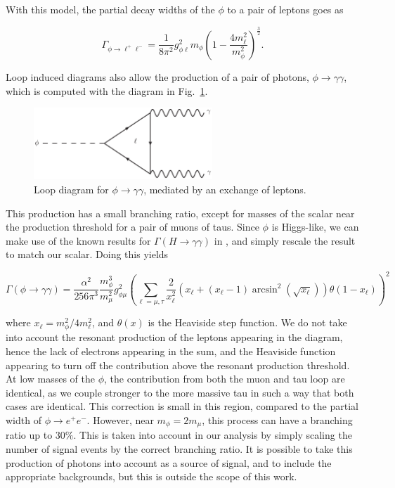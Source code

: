 With this model, the partial decay widths of the $\phi$ to a pair of leptons goes as

\begin{equation}
    \Gamma_{\phi \rightarrow \ell^+ \ell^-} = \frac{1}{8\pi^2} g_{\phi\ell}^2 m_\phi \left(1-\frac{4m_\ell^2}{m_\phi^2}\right)^{\frac{3}{2}}\textrm{.}
\end{equation}

Loop induced diagrams also allow the production of a pair of photons, $\phi \rightarrow \gamma \gamma$, which is computed with the diagram in Fig.~\ref{fig:phi_gammagamma_loop}.

\begin{figure}[h]
    \centering
    \includegraphics[width = 0.6\textwidth]{Figures/feynman_diagrams/phi_gammagamma}
    \caption{Loop diagram for $\phi \rightarrow \gamma \gamma$, mediated by an exchange of leptons.}
    \label{fig:phi_gammagamma_loop}
\end{figure}

\noindent This production has a small branching ratio, except for masses of the scalar near the production threshold for a pair of muons of taus.
Since $\phi$ is Higgs-like, we can make use of the known results for $\Gamma\left(H \rightarrow \gamma \gamma\right)$ in \cite{Djouadi:2005gi}, and simply rescale the result to match our scalar.
Doing this yields

\begin{equation}
    \Gamma\left(\phi \rightarrow \gamma \gamma\right) = \frac{\alpha^2}{256 \pi^3} \frac{m_\phi^3}{m_\mu^2} g_{\phi \mu}^2 \left( \sum_{\ell = \mu, \tau} \frac{2}{x_\ell^2}\left( x_\ell + (x_\ell-1) \arcsin^2\left( \sqrt{x_\ell} \right) \right) \theta(1-x_\ell) \right)^2
\end{equation}

\noindent where $x_\ell = m_\phi^2 / 4 m_\ell^2$, and $\theta(x)$ is the Heaviside step function.
We do not take into account the resonant production of the leptons appearing in the diagram, hence the lack of electrons appearing in the sum, and the Heaviside function appearing to turn off the contribution above the resonant production threshold.
At low masses of the $\phi$, the contribution from both the muon and tau loop are identical, as we couple stronger to the more massive tau in such a way that both cases are identical.
This correction is small in this region, compared to the partial width of $\phi \rightarrow e^+ e^-$.
However, near $m_\phi = 2m_\mu$, this process can have a branching ratio up to $30\%$.
This is taken into account in our analysis by simply scaling the number of signal events by the correct branching ratio.
It is possible to take this production of photons into account as a source of signal, and to include the appropriate backgrounds, but this is outside the scope of this work.


